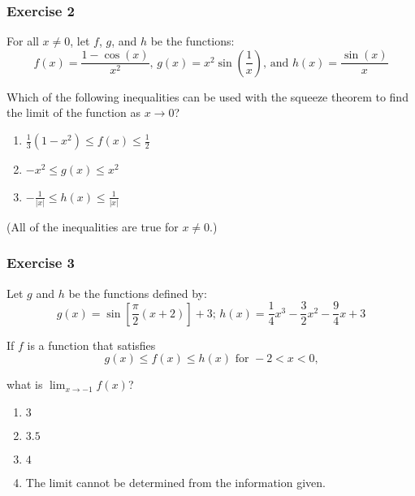 \documentclass[12pt]{beamer}
\begin{document}
\begin{frame}
	\frametitle{Exercise 2}
	For all $x\neq0$, let $f$, $g$, and $h$ be the functions: \[f(x) = \frac{1-\cos(x)}{x^2} \text{, } g(x) = x^2\sin\left(\frac{1}{x}\right) \text{, and } h(x) = \frac{\sin(x)}{x}\]\par
	Which of the following inequalities can be used with the squeeze theorem to find the limit of the function as $x\to0$?\par
	\vspace*{\fill}
	\begin{enumerate}\itemsep2ex
		\item \hfill$\frac{1}{3}(1-x^2) \leq f(x)\leq \frac{1}{2}$\hfill~
		\item \hfill$-x^2\leq g(x)\leq x^2$\hfill~
		\item \hfill$-\frac{1}{|x|}\leq h(x)\leq \frac{1}{|x|}$\hfill~
	\end{enumerate}
	\vspace*{\fill}
	(All of the inequalities are true for $x\neq0$.)
\end{frame}

\begin{frame}
	\frametitle{Exercise 3}
	Let $g$ and $h$ be the functions defined by: \[g(x) = \sin\left[\frac{\pi}{2}(x+2)\right] + 3 \text{; } h(x) = \frac{1}{4}x^3-\frac{3}{2}x^2-\frac{9}{4}x+3\]\par
	If $f$ is a function that satisfies \[g(x)\leq f(x)\leq h(x) \text{ for } -2 < x < 0\text{,}\]\par
	what is $\displaystyle\lim_{x\to-1}f(x)$?
	\begin{enumerate}\itemsep1ex
		\item $3$
		\item $3.5$
		\item $4$
		\item The limit cannot be determined from the information given.
	\end{enumerate}
\end{frame}

\end{document}
